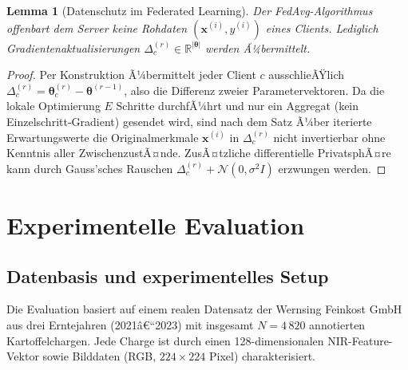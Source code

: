 ﻿\documentclass[12pt,a4paper]{article}
\theoremstyle{plain}
\newtheorem{lemma}[theorem]{Lemma}
\theoremstyle{definition}
\begin{document}
	\begin{lemma}[Datenschutz im Federated Learning]
		\label{lem:privacy}
		Der FedAvg-Algorithmus offenbart dem Server keine Rohdaten
		$(\mathbf{x}^{(i)}, y^{(i)})$ eines Clients. Lediglich Gradientenaktualisierungen
		$\Delta_c^{(r)} \in \mathbb{R}^{|\boldsymbol{\theta}|}$ werden Ã¼bermittelt.
	\end{lemma}
	
	\begin{proof}
		Per Konstruktion Ã¼bermittelt jeder Client $c$ ausschlieÃŸlich
		$\Delta_c^{(r)} = \boldsymbol{\theta}_c^{(r)} - \boldsymbol{\theta}^{(r-1)}$,
		also die Differenz zweier Parametervektoren. Da die lokale Optimierung
		$E$ Schritte durchfÃ¼hrt und nur ein Aggregat (kein Einzelschritt-Gradient)
		gesendet wird, sind nach dem Satz Ã¼ber iterierte Erwartungswerte die
		Originalmerkmale $\mathbf{x}^{(i)}$ in $\Delta_c^{(r)}$ nicht invertierbar
		ohne Kenntnis aller ZwischenzustÃ¤nde. ZusÃ¤tzliche differentielle PrivatsphÃ¤re
		kann durch Gauss'sches Rauschen $\Delta_c^{(r)} + \mathcal{N}(0,
		\sigma^2 I)$ erzwungen werden.
	\end{proof}
	
	\section{Experimentelle Evaluation}
	
	\subsection{Datenbasis und experimentelles Setup}
	
	Die Evaluation basiert auf einem realen Datensatz der Wernsing Feinkost GmbH
	aus drei Erntejahren (2021â€“2023) mit insgesamt $N = 4\,820$ annotierten
	Kartoffelchargen. Jede Charge ist durch einen 128-dimensionalen NIR-Feature-Vektor
	sowie Bilddaten (RGB, $224 \times 224$ Pixel) charakterisiert.
	
\end{document}
